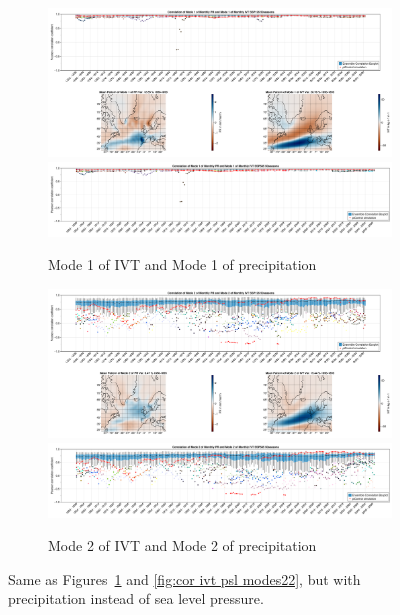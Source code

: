 \begin{figure}[!tbp]
  \begin{subfigure}[b]{0.49\textwidth}
    \includegraphics[width=\textwidth]{figures/correlation_boxplot_pr_ivt_modes11_ssp126_50seasons.png}
    \includegraphics[width=\textwidth]{figures/correlation_boxplot_pr_ivt_modes11_ssp585_50seasons.png}
    \caption{Mode 1 of IVT and Mode 1 of precipitation}
    \label{fig:cor pr ivt modes11}
  \end{subfigure}
  \hfill
  \begin{subfigure}[b]{0.49\textwidth}
    \includegraphics[width=\textwidth]{figures/correlation_boxplot_pr_ivt_modes22_ssp126_50seasons.png}
    \includegraphics[width=\textwidth]{figures/correlation_boxplot_pr_ivt_modes22_ssp585_50seasons.png}
    \caption{Mode 2 of IVT and Mode 2 of precipitation}
    \label{fig:cor pr ivt modes22}
  \end{subfigure}
  \caption{Same as Figures~\ref{fig:cor pr ivt modes11} and \ref{fig:cor ivt psl modes22}, but with precipitation instead of sea level pressure.}
\end{figure}


